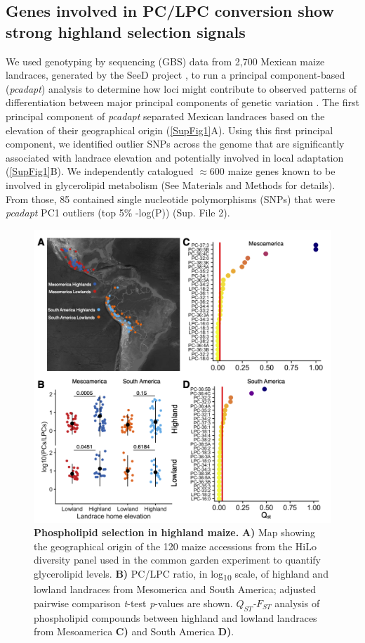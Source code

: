 \documentclass[9pt,twocolumn,twoside,lineno]{BioRxiv}
\begin{document}
\subsection{Genes involved in PC/LPC conversion show strong highland selection signals} 
We used genotyping by sequencing (GBS) data from 2,700 Mexican maize landraces, generated by the SeeD project \cite{Romero_Navarro2017-cn, Gates2019-xu}, to run a principal component-based (\textit{pcadapt}) analysis to determine how loci might contribute to observed patterns of differentiation between major principal components of genetic variation \cite{Luu2017-ws}.
The first principal component of \textit{pcadapt} separated Mexican landraces based on the elevation of their geographical origin (\ref{SupFig1}A).
Using this first principal component, we identified outlier SNPs across the genome that are significantly associated with landrace elevation and potentially involved in local adaptation (\ref{SupFig1}B).
We independently catalogued $\approx 600$ maize genes known to be involved in glycerolipid metabolism (See Materials and Methods for details). From those, 85 contained single nucleotide polymorphisms (SNPs) that were \textit{pcadapt} PC1 outliers (top 5\% -log(P)) (Sup. File 2).
\begin{figure}[hbp]
\begin{center}
\includegraphics[width=0.4\paperwidth]{Figures/Fig_1.png}
\caption{\textbf{Phospholipid selection in highland maize.} 
\textbf{A)} Map showing the geographical origin of the 120 maize accessions from the HiLo diversity panel used in the common garden experiment to quantify glycerolipid levels.
\textbf{B)} PC/LPC ratio, in log\textsubscript{10} scale, of highland and lowland landraces from Mesomerica and South America; adjusted pairwise comparison \textit{t}-test \textit{p}-values are shown.
\textit{$Q_{ST}$-$F_{ST}$} analysis of phospholipid compounds between highland and lowland landraces from Mesoamerica \textbf{C)} and South America \textbf{D)}.
} 
\label{Fig1}
\end{center}
\end{figure}
\end{document}
